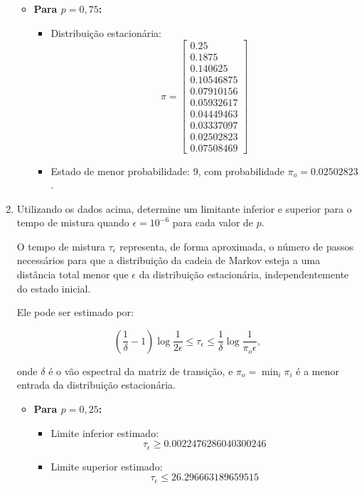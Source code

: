 \begin{enumerate}
\begin{resposta}
\begin{itemize}
            \newpage
            \item \textbf{Para $p = 0{,}75$:}
            \begin{itemize}
                \item Distribuição estacionária:
                $$
                \pi = 
                \begin{bmatrix}
                0.25 \\
                0.1875 \\
                0.140625 \\
                0.10546875 \\
                0.07910156 \\
                0.05932617 \\
                0.04449463 \\
                0.03337097 \\
                \boxed{0.02502823} \\
                0.07508469
                \end{bmatrix}
                $$
                \item Estado de menor probabilidade: 9, com probabilidade $\pi_o = 0.02502823$.
            \end{itemize}
        \end{itemize}



    \end{resposta}
    \item Utilizando os dados acima, determine um limitante inferior e superior para o tempo de mistura quando $\epsilon = 10^{-6}$ para cada valor de $p$.
    \begin{resposta}
        O tempo de mistura $\tau_\epsilon$ representa, de forma aproximada, o número de passos necessários para que a distribuição da cadeia de Markov esteja a uma distância total menor que $\epsilon$ da distribuição estacionária, independentemente do estado inicial.
        
        Ele pode ser estimado por:
        
        $$ \left( \frac{1}{\delta} - 1 \right) \log \frac{1}{2\epsilon} \leq \tau_\epsilon \leq \frac{1}{\delta} \log \frac{1}{\pi_o \epsilon}, $$
        
        onde $\delta$ é o vão espectral da matriz de transição, e $\pi_o = \min_i \pi_i$ é a menor entrada da distribuição estacionária.
        
        \begin{itemize}
            \item \textbf{Para $p = 0{,}25$:}
            \begin{itemize}
                \item Limite inferior estimado:
                $$ \tau_\epsilon \geq 0.0022476286040300246 $$
                \item Limite superior estimado:
                $$ \tau_\epsilon \leq 26.296663189659515 $$
            \end{itemize}
        

\end{itemize}
\end{resposta}
\end{enumerate}
